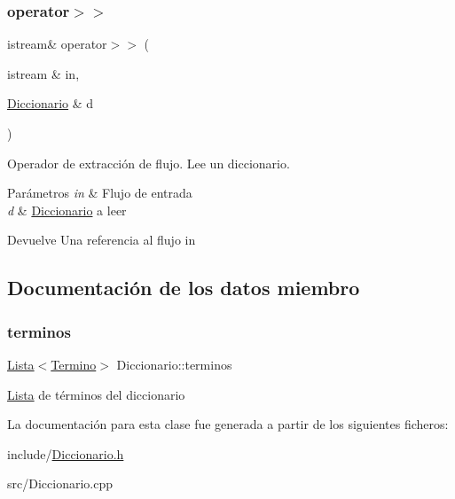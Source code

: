 \subsubsection{\texorpdfstring{operator$>$$>$}{operator>>}}
{\footnotesize\ttfamily istream\& operator$>$$>$ (\begin{DoxyParamCaption}\item[{istream \&}]{in,  }\item[{\mbox{\hyperlink{classDiccionario}{Diccionario}} \&}]{d }\end{DoxyParamCaption})\hspace{0.3cm}{\ttfamily [friend]}}



Operador de extracción de flujo. Lee un diccionario. 


\begin{DoxyParams}{Parámetros}
{\em in} & Flujo de entrada \\
\hline
{\em d} & \mbox{\hyperlink{classDiccionario}{Diccionario}} a leer \\
\hline
\end{DoxyParams}
\begin{DoxyReturn}{Devuelve}
Una referencia al flujo in 
\end{DoxyReturn}


\subsection{Documentación de los datos miembro}
\mbox{\label{classDiccionario_a0e5b96246ec9ebd50c5e9290cd7f28a8}} 
\subsubsection{\texorpdfstring{terminos}{terminos}}
{\footnotesize\ttfamily \mbox{\hyperlink{classLista}{Lista}}$<$\mbox{\hyperlink{classTermino}{Termino}}$>$ Diccionario\+::terminos\hspace{0.3cm}{\ttfamily [private]}}

\mbox{\hyperlink{classLista}{Lista}} de términos del diccionario 

La documentación para esta clase fue generada a partir de los siguientes ficheros\+:\begin{DoxyCompactItemize}
\item 
include/\mbox{\hyperlink{Diccionario_8h}{Diccionario.\+h}}\item 
src/Diccionario.\+cpp\end{DoxyCompactItemize}
